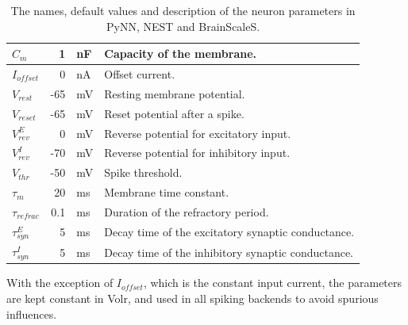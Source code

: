 \renewcommand{\arraystretch}{1.3} 
\begin{table}
\begin{tabular}[center]{l r l l}
  \hline
  $C_m$ & 1 & nF & Capacity of the membrane. \\ \hline
  $I_{offset}$ & 0 & nA & Offset current. \\ \hline
  $V_{rest}$ & -65 & mV & Resting membrane potential. \\ \hline
  $V_{reset}$ & -65 & mV & Reset potential after a spike. \\ \hline
  $V_{rev}^E$ & 0 & mV & Reverse potential for excitatory input. \\ \hline
  $V_{rev}^I$ & -70 & mV & Reverse potential for inhibitory input. \\ \hline
  $V_{thr}$ & -50 & mV & Spike threshold. \\ \hline
  $\tau_m$ & 20 & ms & Membrane time constant. \\ \hline
  $\tau_{refrac}$ & 0.1 & ms & Duration of the refractory period. \\ \hline
  $\tau_{syn}^E$ & 5 & ms & Decay time of the excitatory synaptic conductance. \\ \hline
  $\tau_{syn}^I$ & 5 & ms & Decay time of the inhibitory synaptic conductance. \\  \hline
\end{tabular}
\caption{The names, default values and description of the neuron parameters in
PyNN, NEST and BrainScaleS.}
\label{tab:neuron_parameters}
\end{table}

With the exception of $I_{offset}$, which is the constant input current,
the parameters are kept constant in Volr, and used in all spiking backends
to avoid spurious influences.
